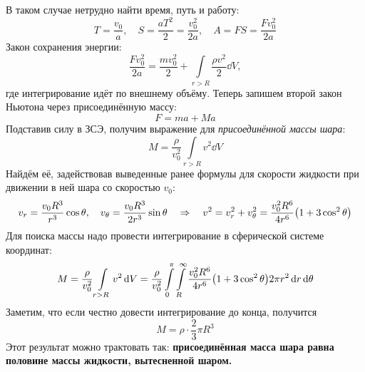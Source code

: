 В таком случае нетрудно найти время, путь и работу:
\begin{equation}
    T=\frac{v_0}{a}, \quad S = \frac{aT^2}{2} = \frac{v_0^2}{2a}, \quad
    A = FS = \frac{Fv_0^2}{2a}
\end{equation}
Закон сохранения энергии:
\begin{equation}
    \frac{Fv_0^2}{2a} = \frac{mv_0^2}{2} + \int\limits_{r>R} \frac{\rho v^2}{2} \dd{V},
\end{equation}
где интегрирование идёт по внешнему объёму. Теперь запишем второй закон Ньютона через присоединённую массу: 
\begin{equation}
    F= ma +Ma
\end{equation}
Подставив силу в ЗСЭ,  получим выражение для \textit{присоединённой массы шара}:
\begin{equation}
    M  = \frac{\rho}{v_0^2} \int\limits_{r>R} v^2 \dd{V}
\end{equation}
Найдём её, задействовав выведенные ранее формулы для скорости жидкости при движении в ней шара со скоростью $v_0$:
\begin{equation}
    v_r= \frac{v_0 R^3}{r^3}\cos\theta, \quad
    v_\theta = \frac{v_0 R^3}{2r^3} \sin\theta 
    \quad\Rightarrow\quad 
    v^2 = v_r^2 + v_\theta^2 = \frac{v_0^2 R^6}{4r^6}
        \qty(1+3\cos^2\theta)
\end{equation}
Для поиска массы надо провести интегрирование в сферической системе координат:
\begin{equation}
    M= \frac{\rho}{v_0^2} \int\limits_{r>R} v^2 \dd{V}=
    \frac{\rho}{v_0^2} \int\limits_0^\pi \int\limits_R^\infty  \frac{v_0^2 R^6}{4r^6}
        \qty(1+3\cos^2\theta)
 2\pi r^2 \dd{r} \dd{\theta}
\end{equation}
Заметим, что если честно довести интегрирование до конца, получится
\begin{equation}
    M = \rho \cdot \frac{2}{3} \pi R^3
\end{equation}
Этот результат можно трактовать так: \textbf{присоединённая масса шара равна половине массы жидкости, вытесненной шаром.}

